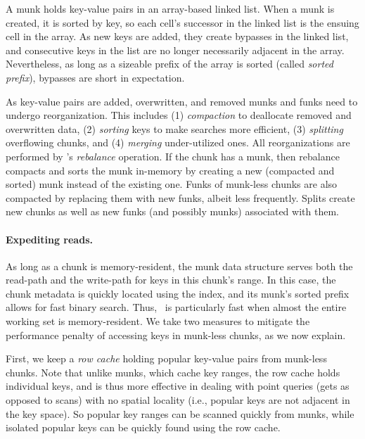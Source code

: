 A munk holds key-value pairs in an array-based linked list.  
When a munk is created, 
it is sorted by key, so each cell's successor in the linked list is the ensuing cell in the array.
As new keys are added, they create bypasses in the linked list, and consecutive keys in the
list are no longer necessarily adjacent in the array. Nevertheless, as long as 
a sizeable prefix of the  array  is sorted (called \emph{sorted prefix}), bypasses are short in expectation.


As key-value pairs are added, overwritten, and removed munks and funks need to undergo reorganization. This includes  
(1) \emph{compaction} to deallocate removed and overwritten data, 
(2) \emph{sorting} keys to make searches more efficient,  
(3) \emph{splitting} overflowing chunks, and
(4) \emph{merging} under-utilized ones.
All reorganizations are performed by \sys's \emph{rebalance} operation.
If the chunk has a munk, then rebalance compacts and sorts the munk in-memory by creating a new 
(compacted and sorted) munk instead of the existing one. 
Funks of munk-less chunks are also compacted by replacing them with new funks, albeit less frequently.
Splits  create new chunks as well as new  funks (and possibly munks) associated with them.

\paragraph{Expediting reads.}
As long as a chunk  is memory-resident, the munk data structure serves both the read-path and the write-path for keys in this chunk's range. 
In this case, the chunk metadata is quickly located using the index, and its munk's sorted prefix allows for fast binary search.
Thus, \sys\ is particularly fast when almost the entire working set is memory-resident. 
We take two measures to mitigate the performance penalty of accessing keys in munk-less   chunks, 
 as we now explain.

First, we keep a \emph{row cache} holding popular key-value pairs from munk-less chunks. Note that unlike munks, which cache key ranges, the row
cache holds individual keys, and is thus more effective in dealing with point queries (gets as opposed to scans) with no
spatial locality (i.e., popular keys are not adjacent in the key space). 
So popular key ranges %
can be scanned quickly from munks, 
while  isolated popular keys %
can be quickly found using the row cache.

